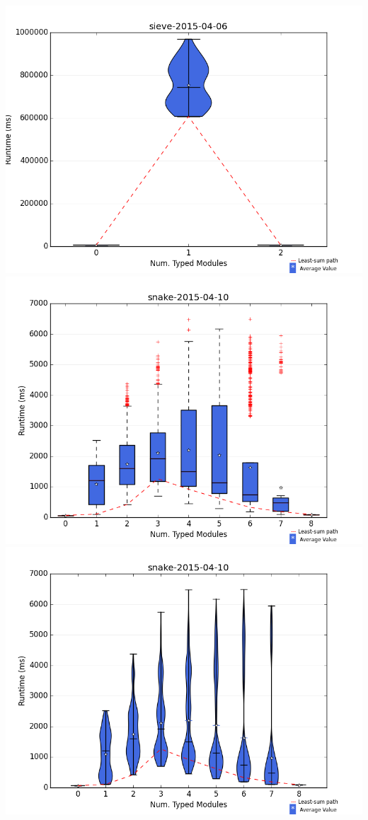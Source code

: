 \documentclass{article}
\begin{document}
\includegraphics[width=\textwidth]{violins/sieve-2015-04-06-violin.png}
\newpage
\includegraphics[width=\textwidth]{boxplots/snake-2015-04-10-boxplot.png}
\includegraphics[width=\textwidth]{violins/snake-2015-04-10-violin.png}
\end{document}
